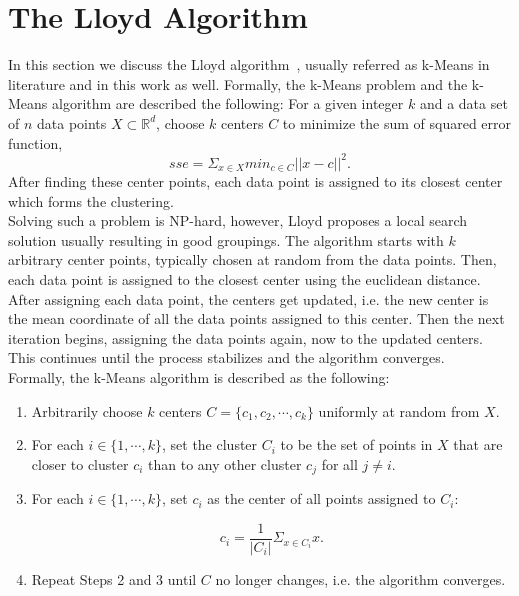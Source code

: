 \section{The Lloyd Algorithm}

In this section we discuss the Lloyd algorithm~\parencite{Lloyd82}, usually referred as k-Means in literature and in this work as well. Formally, the k-Means problem and the k-Means algorithm are described the following: For a given integer $k$ and a data set of $n$ data points $X \subset  \mathbb{R}^d$, choose $k$ centers $C$ to minimize the sum of squared error function,
\begin{equation*}
sse = \Sigma_{x \in X} min_{c \in C} ||x - c||^2.
\end{equation*}
After finding these center points, each data point is assigned to its closest center which forms the clustering. 
\\ 
Solving such a problem is NP-hard, however, Lloyd proposes a local search solution usually resulting in good groupings. The algorithm starts with $k$ arbitrary center points, typically chosen at random from the data points. Then, each data point is assigned to the closest center using the euclidean distance. After assigning each data point, the centers get updated, i.e. the new center is the mean coordinate of all the data points assigned to this center. Then the next iteration begins, assigning the data points again, now to the updated centers. This continues until the process stabilizes and the algorithm converges.
\\
Formally, the k-Means algorithm is described as the following:

\begin{enumerate} 
\item Arbitrarily choose $k$ centers $C = \{c_1, c_2, \cdots, c_k\}$ uniformly at random from $X$.
\item For each $i \in \{1, \cdots, k\}$, set the cluster $C_i$ to be the set of points in $X$ that are closer to cluster $c_i$ than to any other cluster $c_j$ for all $j \neq i$.
\item For each $i \in \{1, \cdots, k\}$, set $c_i$ as the center of all points assigned to $C_i$: 

\begin{equation*}
c_i = \frac{1}{|C_i|} \Sigma_{x \in C_i} x.
\end{equation*}

\item Repeat Steps 2 and 3 until $C$ no longer changes, i.e. the algorithm converges.
\end{enumerate}

